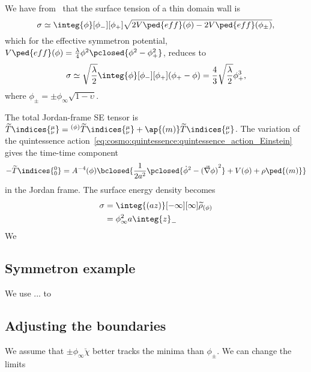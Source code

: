 



We have from~\citet{christiansenGravitationalWavesDark2024} that the surface tension of a thin domain wall is
\begin{equation}\label{eq:derivations:surface_tension:sigma_V_eff}
    \sigma \simeq \integ{\phi}[\phi_-][\phi_+] \sqrt{ 2V\ped{eff}(\phi)-2V\ped{eff}(\phi_\pm) },
\end{equation}
which for the effective symmetron potential, $V\ped{eff}(\phi) = \frac{\lambda}{4}\phi^2\pclosed{\phi^2 -\phi_+^2} $, reduces to 
\begin{equation}
    \sigma \simeq  \sqrt{\frac{\lambda}{2}}\integ{\phi}[\phi_-][\phi_+]  (\phi_+ - \phi) = \frac{4}{3}\sqrt{\frac{\lambda}{2}} \phi_+^3,
\end{equation}
where $\phi_\pm = \pm \phi_\infty \sqrt{1-\upsilon}$.



The total Jordan-frame SE tensor is $\widetilde{T}\indices{^\mu_\nu} =  {}^{(\phi)}\widetilde{T}\indices{^\mu_\nu} + {}\ap{(m)}\widetilde{T}\indices{^\mu_\nu} $. %
The variation of the quintessence action~\cref{eq:cosmo:quintessence:quintessence_action_Einstein} gives the time-time component %
\begin{equation}
    -\widetilde{T}\indices{^0_0} = 
    A^{-4}(\phi)\bclosed{\frac{1}{2a^2}\pclosed{\dot{\phi}^2 - {(\vec{\nabla}\phi)}^2 } +V(\phi)  + \rho\ped{(m)}}
\end{equation}
in the Jordan frame. %
The surface energy density becomes~\citep{llinaresDomainWallsCoupled2014,pressDynamicalEvolutionDomain1989}
\begin{align}
    \sigma &= \integ{(az)}[-\infty][\infty] \widetilde{\rho}_{(\phi)} \nonumber \\%
    &= \phi_\infty^2 a\integ{z}_{-}
\end{align}
We 

\citet{llinaresDomainWallsCoupled2014}

\subsection{Symmetron example}
    We use ... to 


    


\subsection{Adjusting the boundaries}
    We assume that $\pm\phi_\infty\breve{\chi}$ better tracks the minima than $\phi_\pm$. We can change the limits 
